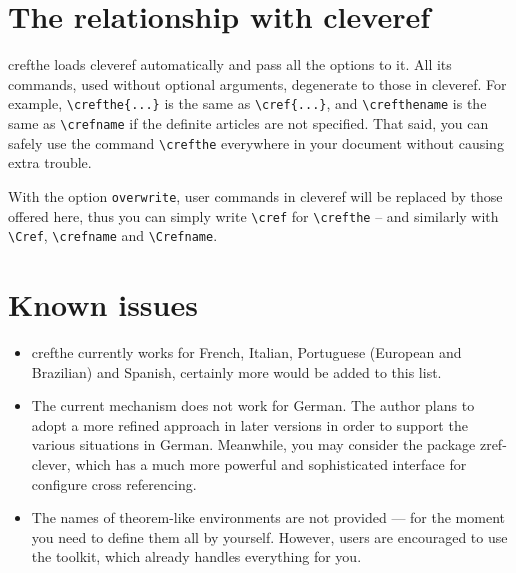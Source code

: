 \documentclass[classical]{einfart}
\newcommand{\crefthepackage}{\textsf{crefthe}}
\begin{document}
\section{The relationship with \textsf{cleveref}}

\crefthepackage{} loads \textsf{cleveref} automatically and pass all the options to it. All its commands, used without optional arguments, degenerate to those in \textsf{cleveref}. For example, \lstinline|\crefthe{...}| is the same as \lstinline|\cref{...}|, and \lstinline|\crefthename| is the same as \lstinline|\crefname| if the definite articles are not specified. That said, you can safely use the command \lstinline|\crefthe| everywhere in your document without causing extra trouble.

With the option \texttt{overwrite}, user commands in \textsf{cleveref} will be replaced by those offered here, thus you can simply write \lstinline|\cref| for \lstinline|\crefthe| -- and similarly with \lstinline|\Cref|, \lstinline|\crefname| and \lstinline|\Crefname|.


\section{Known issues}
\begin{itemize}
    \item \crefthepackage{} currently works for French, Italian, Portuguese (European and Brazilian) and Spanish, certainly more would be added to this list.
    \item The current mechanism does not work for German. The author plans to adopt a more refined approach in later versions in order to support the various situations in German. Meanwhile, you may consider the package \textsf{zref-clever}, which has a much more powerful and sophisticated interface for configure cross referencing.
    \item The names of theorem-like environments are not provided --- for the moment you need to define them all by yourself. However, users are encouraged to use the \ProjLib{} toolkit, which already handles everything for you.
\end{itemize}
\end{document}
